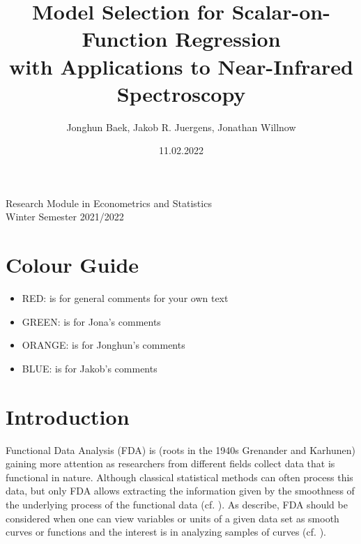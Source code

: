 \documentclass[11pt,twoside,a4paper]{article}
\begin{document}
	\title{{\LARGE Model Selection for Scalar-on-Function Regression \\ with Applications to Near-Infrared Spectroscopy}}
	\author{Jonghun Baek, Jakob R. Juergens, Jonathan Willnow}
	\date{11.02.2022}
	\maketitle
	\vspace{1.5 cm}
	\begin{center}
		Research Module in Econometrics and Statistics \\
		Winter Semester 2021/2022
	\end{center}
	
	\newpage
	
	\tableofcontents
	
	\newpage
	
	\section{Colour Guide}
		\begin{itemize}
			\item {\color{red} RED}: is for general comments for your own text
			\item {\color{green} GREEN}: is for Jona's comments
			\item {\color{orange} ORANGE}: is for Jonghun's comments
			\item {\color{blue} BLUE}: is for Jakob's comments
		\end{itemize}
	
	\section{Introduction}
		
	Functional Data Analysis (FDA) is {\color{red} (roots in the 1940s Grenander and Karhunen)} gaining more attention as researchers from different fields collect data that is functional in nature. Although classical statistical methods can often process this data, but only FDA allows extracting the information given by the smoothness of the underlying process of the functional data (cf. \cite{levitin_introduction_2007}).
	 As \cite{kokoszka_introduction_2017} describe, FDA should be considered when one can view variables or units of a given data set as smooth curves or functions and the interest is in analyzing samples of curves (cf. \cite[S.~17]{kokoszka_introduction_2017}).
	 
\end{document}
